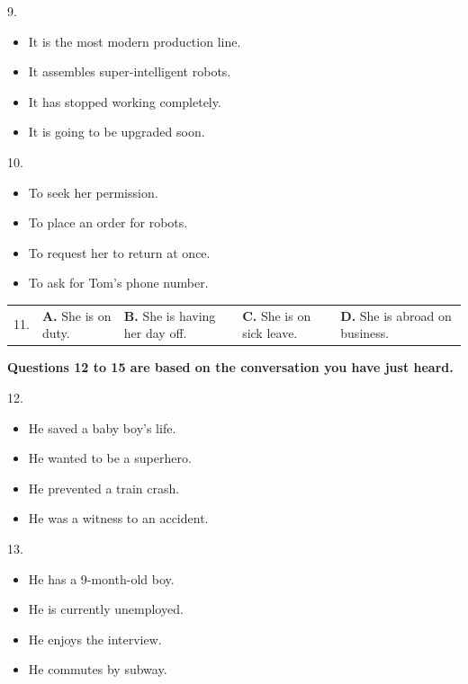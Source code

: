 \documentclass[UTF8,11pt]{ctexart}
\begin{document}
9.


\begin{itemize}[leftmargin=2em,itemsep=.2em,topsep=.4em]\item[A.] It is the most modern production line.
\item[B.] It assembles super-intelligent robots.
\item[C.] It has stopped working completely.
\item[D.] It is going to be upgraded soon.
\end{itemize}

10.


\begin{itemize}[leftmargin=2em,itemsep=.2em,topsep=.4em]\item[A.] To seek her permission.
\item[B.] To place an order for robots.
\item[C.] To request her to return at once.
\item[D.] To ask for Tom's phone number.
\end{itemize}

\noindent\begin{tabularx}{\linewidth}{@{}lXXXX@{}}11. & \textbf{A.} She is on duty. & \textbf{B.} She is having her day off. & \textbf{C.} She is on sick leave. & \textbf{D.} She is abroad on business.\\\end{tabularx}\par

\textbf{Questions 12 to 15 are based on the conversation you have just heard.}


12.


\begin{itemize}[leftmargin=2em,itemsep=.2em,topsep=.4em]\item[A.] He saved a baby boy's life.
\item[B.] He wanted to be a superhero.
\item[C.] He prevented a train crash.
\item[D.] He was a witness to an accident.
\end{itemize}

13.


\begin{itemize}[leftmargin=2em,itemsep=.2em,topsep=.4em]\item[A.] He has a 9-month-old boy.
\item[B.] He is currently unemployed.
\item[C.] He enjoys the interview.
\item[D.] He commutes by subway.
\end{itemize}
\end{document}
